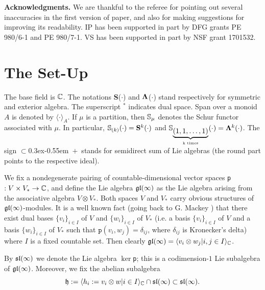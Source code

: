 \documentclass[12pt]{amsart}
\makeatletter
\def\mathbb{\Bbb}
\def\mathfrak{\frak}
\def\@putname#1#2#3#4{\def\@@ref{#3}\let\old@bf\bf
        \def\bf##1{\old@bf\if?\noexpand##1?{#4}\else##1\fi}%
        #1{#2}%
        \let\bf\old@bf}
\def\@putname#1#2#3#4{\def\@@ref{#3}\let\old@bf\bf    %
        \let\old@reset@font\reset@font                  %
        \def\bf##1{\old@bf\if?\noexpand##1?{#4}\else##1\fi}%
        \def\reset@font##1##2{\old@reset@font##1\if?\noexpand##2?{#4}\else##2\fi}#1{#2}%
        \let\bf\old@bf\let\reset@font\old@reset@font}
\let\my@cite=\cite
\def\cite#1{\@putname\my@cite{#1}{\@citeb}{\tiny\rm\@@ref}}
\theoremstyle{plain} %
\numberwithin{equation}{section}
\theoremstyle{definition}
\theoremstyle{remark}
\theoremstyle{plain} %
\def\clplus{\hbox{$\subset${\raise0.3ex\hbox{\kern -0.55em ${\scriptscriptstyle +}$}}\ }}
\makeatother
\begin{document}
{\bf Acknowledgments.} We are thankful to the referee for pointing out several inaccuracies in the first version of paper, and also for making suggestions for improving its readability. IP has been supported in part by DFG grants PE 980/6-1 and PE 980/7-1. VS has been supported in part by NSF grant 1701532.



        \section{The Set-Up}

The base field is $\mathbb{C}$.  
The notations {\bf S}($\cdot$) and { $\bf\Lambda$}($\cdot$) stand respectively for symmetric and exterior algebra. The superscript $^*$ indicates dual space. Span over a monoid $A$ is denoted by $\langle\cdot \rangle_{A}$.  If $\mu$ is a partition, then $\mathbb S_\mu$ denotes the Schur functor associated with $\mu$. In  particular, $\mathbb{S}_{(k)}(\cdot)= {\bf S}^k(\cdot)$ and $\mathbb{S}_{\underbrace{(1,1,\dots, 1)}_{\text{k times}}}(\cdot)={\bf \Lambda}^k(\cdot)$. The sign \clplus  stands for semidirect sum of Lie algebras (the round part points to the respective ideal).

 We fix a nondegenerate pairing of countable-dimensional vector spaces \texttt{p}$:V\times V_*\to \mathbb{C}$, and define the
Lie algebra $\mathfrak{gl}(\infty)$ as the Lie algebra arising from the associative algebra $V\otimes V_*$.   Both spaces $V$ and $V_*$ carry obvious structures
of $\mathfrak{gl}(\infty)$-modules.  It is a  well known fact (going back to G. Mackey \cite{Mac}) that there exist dual bases $\{v_i\}_{i\in I}$ of $V$ and $\{w_i\}_{i\in I}$ of $V_*$
(i.e. a basis $\{v_i\}_{i\in I}$ of $V$ and a basis $\{w_i\}_{i\in I}$ of $V_*$ such that $\texttt{p}(v_i,w_j)=\delta_{ij}$, where $\delta_{ij}$ is Kronecker's delta) where $I$ is a fixed countable set.  Then clearly $\mathfrak{gl}(\infty)=\langle v_i\otimes w_j|{i,j\in I}\rangle_\mathbb C$.



 By $\mathfrak{sl}(\infty)$ we denote the
Lie algebra $\ker$\texttt{p}; this is a codimension-$1$ Lie subalgebra of $\mathfrak{gl}(\infty)$. Moreover, we fix the abelian subalgebra $$\mathfrak{h}:=\langle h_i:=v_i\otimes w|{i\in I}\rangle_\mathbb C\cap\mathfrak{sl}(\infty)\subset \mathfrak{sl}{(\infty)}.$$
\end{document}
